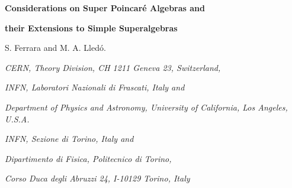 \documentclass[a4paper,12pt]{article}
\begin{document}

\providecommand{\id}{\relax{\rm 1\kern-.35em 1}}

\providecommand{\Z}{\mathbb{Z}}
\providecommand{\R}{\mathbb{R}}
\providecommand{\C}{\mathbb{C}}
\providecommand{\N}{\mathbb{N}}
\providecommand{\Ha}{\mathbb{H}}

\providecommand{\fiso}{\mathfrak{iso}}
\providecommand{\fso}{\mathfrak{so}}
\providecommand{\fosp}{\mathfrak{osp}}
\providecommand{\fsp}{\mathfrak{sp}}
\providecommand{\fsl}{\mathfrak{sl}}
\providecommand{\fsu}{\mathfrak{su}}
\providecommand{\fspin}{\mathfrak{spin}}
\providecommand{\ff}{\mathfrak{f}}
\providecommand{\fg}{\mathfrak{g}}
\providecommand{\fu}{\mathfrak{u}}
\providecommand{\fo}{\mathfrak{o}}
\providecommand{\fgl}{\mathfrak{gl}}
\providecommand{\fii}{\mathfrak{i}}
\providecommand{\fusp}{\mathfrak{usp}}

\providecommand{\g}{\mathcal{G}}
\providecommand{\s}{\mathcal{S}}
\providecommand{\ka}{\mathcal{K}}
\providecommand{\p}{\mathcal{P}}
\providecommand{\A}{\mathcal{A}}
\providecommand{\I}{\mathcal{I}}
\providecommand{\Ca}{\mathcal{C}}
\providecommand{\La}{\mathcal{L}}
\providecommand{\Qa}{\mathcal{Q}}


\vskip 1.5cm


  \centerline{\LARGE \bf Considerations on Super Poincar\'e Algebras and  }

  \smallskip

\centerline{\LARGE \bf  their Extensions to Simple Superalgebras }
 \vskip 3cm
\centerline{S. Ferrara\myHighlight{$^\star$}\coordHE{} and M. A. Lled\'o\myHighlight{$^\dagger$}\coordHE{}.}

\vskip 1.5cm





\centerline{\it \myHighlight{$^\star$}\coordHE{} CERN, Theory Division, CH 1211 Geneva 23,
Switzerland, } \centerline{\it INFN, Laboratori Nazionali di
Frascati, Italy and } \centerline{\it Department of Physics and
Astronomy, University of California, Los Angeles, U.S.A.}

\medskip

\centerline{\it \myHighlight{$^\dagger$}\coordHE{}  INFN, Sezione di Torino, Italy and }
\centerline{\it Dipartimento di Fisica, Politecnico di Torino,}
\centerline{\it Corso Duca degli Abruzzi 24, I-10129 Torino,
Italy}



\vskip 1cm
\end{document}
